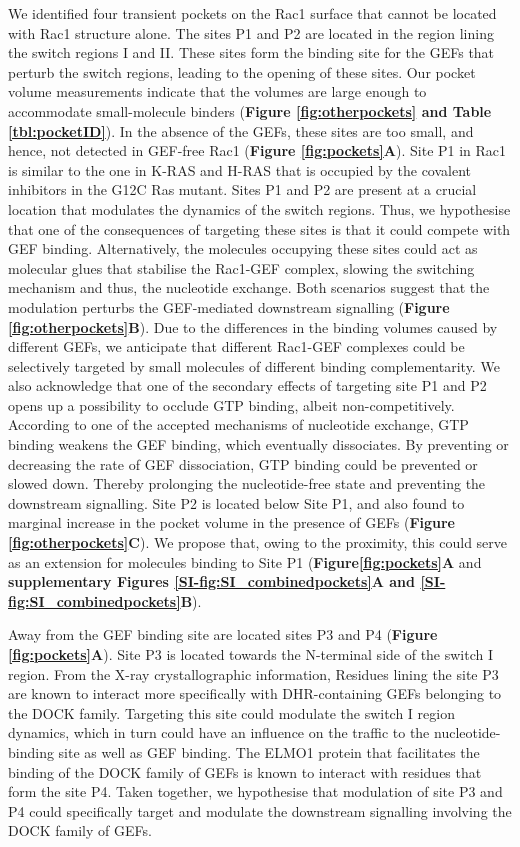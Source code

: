 \documentclass[12pt, a4paper]{achemso}
\begin{document}
We identified four transient pockets on the Rac1 surface that cannot be located with Rac1 structure alone. The sites P1 and P2 are located in the region lining the switch regions I and II. These sites form the binding site for the GEFs that perturb the switch regions, leading to the opening of these sites. Our pocket volume measurements indicate that the volumes are large enough to accommodate small-molecule binders (\textbf{Figure \ref{fig:otherpockets} and Table \ref{tbl:pocketID}}). In the absence of the GEFs, these sites are too small, and hence, not detected in GEF-free Rac1 (\textbf{Figure \ref{fig:pockets}A}).  
Site P1 in Rac1 is similar to the one in K-RAS and H-RAS \cite{sun2012discovery, maurer2012small} that is occupied by the covalent inhibitors in the G12C Ras mutant.  Sites P1 and P2 are present at a crucial location that modulates the dynamics of the switch regions. Thus, we hypothesise that one of the consequences of targeting these sites is that it could compete with GEF binding. Alternatively, the molecules occupying these sites could act as molecular glues that stabilise the Rac1-GEF complex, slowing the switching mechanism and thus, the nucleotide exchange. Both scenarios suggest that the modulation perturbs the GEF-mediated downstream signalling (\textbf{Figure \ref{fig:otherpockets}B}). Due to the differences in the binding volumes caused by different GEFs, we anticipate that different Rac1-GEF complexes could be selectively targeted by small molecules of different binding complementarity. We also acknowledge that one of the secondary effects of targeting site P1 and P2 opens up a possibility to occlude GTP binding, albeit non-competitively. According to one of the accepted mechanisms of nucleotide exchange\cite{cherfils2013regulation}, GTP binding weakens the GEF binding, which eventually dissociates. By preventing or decreasing the rate of GEF dissociation, GTP binding could be prevented or slowed down. Thereby prolonging the nucleotide-free state and preventing the downstream signalling. Site P2 is located below Site P1, and also found to marginal increase in the pocket volume in the presence of GEFs (\textbf{Figure \ref{fig:otherpockets}C}). We propose that, owing to the proximity, this could serve as an extension for molecules binding to Site P1 (\textbf{Figure\ref{fig:pockets}A} and \textbf{supplementary Figures \ref{SI-fig:SI_combinedpockets}A and \ref{SI-fig:SI_combinedpockets}B}).

Away from the GEF binding site are located sites P3 and P4 (\textbf{Figure \ref{fig:pockets}A}). Site P3 is located towards the N-terminal side of the switch I region. From the X-ray crystallographic information, Residues lining the site P3 are known to interact more specifically with DHR-containing GEFs belonging to the DOCK family\cite{DOCK5_EMLO1, dock2pdb}. Targeting this site could modulate the switch I region dynamics, which in turn could have an influence on the traffic to the nucleotide-binding site as well as GEF binding.  The ELMO1 protein that facilitates the binding of the DOCK family of GEFs is known to interact with residues that form the site P4\cite{DOCK5_EMLO1}. Taken together, we hypothesise that modulation of site P3 and P4 could specifically target and modulate the downstream signalling involving the DOCK family of GEFs. 
\end{document}

